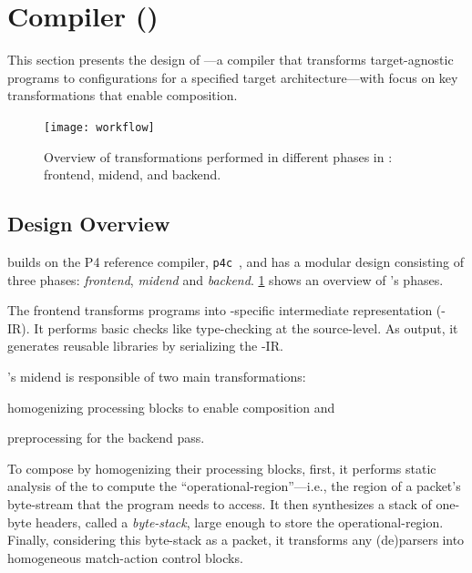 \documentclass[letterpaper,twocolumn,10pt]{article}
\begin{document}
\section{\ulang Compiler (\ucomp)}
\label{sec:compiler}
This section presents the design of \ucomp---a compiler that
transforms target-agnostic \ulang programs to configurations for a
specified target architecture---with focus on key transformations that
enable composition.

\begin{figure}[!tbh]
  \centering
  \texttt{[image: workflow]}
  \caption{Overview of transformations performed in different phases
  in \ucomp: frontend, midend, and backend.}
  \label{fig:workflow}
\end{figure}

\subsection{\ucomp Design Overview}
\label{sec:compiler-design}
\ucomp builds on the P4 reference compiler, \texttt{p4c}~\cite{p4c},
and has a modular design consisting of three phases: \emph{frontend},
\emph{midend} and \emph{backend}. \cref{fig:workflow} shows an
overview of \ucomp's phases.

%
The frontend transforms \ulang programs into \ucomp-specific
intermediate representation (\ucomp-IR). It performs basic checks like
type-checking at the source-level. As output, it generates reusable
libraries by serializing the \ucomp-IR.

%
\ucomp's midend is responsible of two main transformations:
\begin{enumerate*}[label=(\roman*)]
  \item homogenizing processing blocks to enable composition and
  \item preprocessing for the backend pass.
\end{enumerate*}

To compose \uprograms by homogenizing their processing blocks, first,
it performs static analysis of the \uprogram to compute the
``operational-region''---i.e., the region of a packet's byte-stream
that the program needs to access. It then synthesizes a stack of
one-byte headers, called a \emph{byte-stack}, large enough to store
the operational-region. Finally, considering this byte-stack as a
packet, it transforms any (de)parsers into homogeneous match-action
control blocks.
\end{document}

